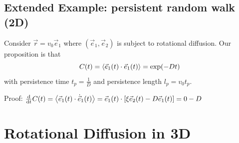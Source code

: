 \documentclass{notebook}
\begin{document}
\subsection*{Extended Example: persistent random walk (2D)}

Consider $\vec{r} = v_0 \vec{e}_1$ where $(\vec{e}_1, \vec{e}_2)$ is subject to rotational diffusion. Our proposition is that
%
\begin{equation}
	C(t) = \expval{\vec{e}_1(t) \cdot \vec{e}_1(t)} = \exp(- D t)
\end{equation}
%
with persistence time $t_p = \frac{1}{D}$ and persistence length $l_p = v_0 t_p$. 

Proof: $\dv{t} C(t) = \expval{\vec{e}_1(t) \cdot \dot{\vec{e}}_1(t)} = \vec{e}_1(t) \cdot [\xi \vec{e}_2(t) - D \vec{e}_1(t)] = 0 - D$

\section{Rotational Diffusion in 3D}
\end{document}
